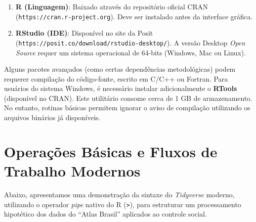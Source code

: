 \documentclass[
  brazilian,
  11pt,
  a4paper,
  open = right,
  twoside = true]{scrbook}
\providecommand{\tightlist}{%
  \setlength{\itemsep}{0pt}\setlength{\parskip}{0pt}}
\begin{document}
\begin{enumerate}
\def\labelenumi{\arabic{enumi}.}
\tightlist
\item
  \textbf{R (Linguagem)}: Baixado através do repositório oficial CRAN
  (\texttt{https://cran.r-project.org}). Deve ser instalado antes da
  interface gráfica.
\item
  \textbf{RStudio (IDE)}: Disponível no site da Posit
  (\texttt{https://posit.co/download/rstudio-desktop/}). A versão
  Desktop \emph{Open Source} requer um sistema operacional de 64-bits
  (Windows, Mac ou Linux).
\end{enumerate}

\begin{tcolorbox}[enhanced jigsaw, arc=.35mm, bottomrule=.15mm, bottomtitle=1mm, breakable, colback=white, colbacktitle=quarto-callout-note-color!10!white, colframe=quarto-callout-note-color-frame, coltitle=black, left=2mm, leftrule=.75mm, opacityback=0, opacitybacktitle=0.6, rightrule=.15mm, title=\textcolor{quarto-callout-note-color}{\faInfo}\hspace{0.5em}{Compilação e RTools (Usuários de Windows)}, titlerule=0mm, toprule=.15mm, toptitle=1mm]

Alguns pacotes avançados (como certas dependências metodológicas) podem
requerer compilação do código-fonte, escrito em C/C++ ou Fortran. Para
usuários do sistema Windows, é necessário instalar adicionalmente o
\textbf{RTools} (disponível no CRAN). Este utilitário consome cerca de 1
GB de armazenamento. No entanto, rotinas básicas permitem ignorar o
aviso de compilação utilizando os arquivos binários já disponíveis.

\end{tcolorbox}

\chapter{Operações Básicas e Fluxos de Trabalho
Modernos}\label{operauxe7uxf5es-buxe1sicas-e-fluxos-de-trabalho-modernos}

Abaixo, apresentamos uma demonstração da sintaxe do \emph{Tidyverse}
moderno, utilizando o operador \emph{pipe} nativo do R
(\texttt{\textbar{}\textgreater{}}), para estruturar um processamento
hipotético dos dados do ``Atlas Brasil'' aplicados ao controle social.
\end{document}
